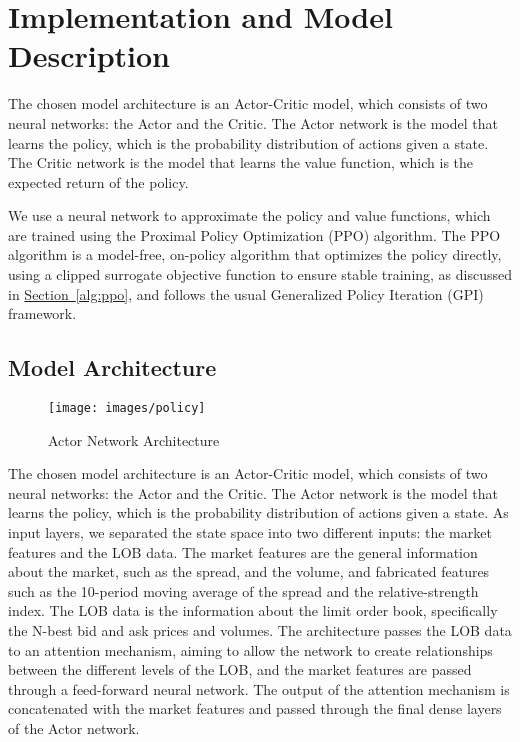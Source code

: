 \section{Implementation and Model Description}
\label{sec:implementation-and-model-description}

The chosen model architecture is an Actor-Critic model, which consists of two neural networks: the Actor and the Critic.
The Actor network is the model that learns the policy, which is the probability distribution of actions given a state.
The Critic network is the model that learns the value function, which is the expected return of the policy.

We use a neural network to approximate the policy and value functions, which are trained using the Proximal Policy Optimization (PPO) algorithm.
The PPO algorithm is a model-free, on-policy algorithm that optimizes the policy directly, using a clipped surrogate objective function to ensure stable training,
as discussed in \hyperref[alg:ppo]{Section~\ref{alg:ppo}}, and follows the usual Generalized Policy Iteration (GPI) framework.

\subsection{Model Architecture}
\label{subsec:model-architecture}

\begin{figure}[H]
    \centering
    \texttt{[image: images/policy]}
    \caption{Actor Network Architecture}
    \label{fig:actor-architecture}
\end{figure}

The chosen model architecture is an Actor-Critic model, which consists of two neural networks: the Actor and the Critic.
The Actor network is the model that learns the policy, which is the probability distribution of actions given a state.
As input layers, we separated the state space into two different inputs: the market features and the LOB data.
The market features are the general information about the market, such as the spread, and the volume,
and fabricated features such as the 10-period moving average of the spread and the relative-strength index.
The LOB data is the information about the limit order book, specifically the N-best bid and ask prices and volumes.
The architecture passes the LOB data to an attention mechanism,
aiming to allow the network to create relationships between the different levels of the LOB,
and the market features are passed through a feed-forward neural network.
The output of the attention mechanism is concatenated with the market features and passed through the final dense layers of the Actor network.

